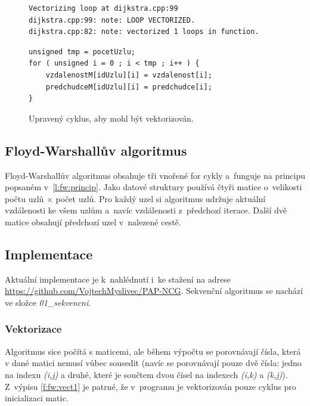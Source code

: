 \begin{figure}
    \centering
    \caption{Upravený cyklus, aby mohl být vektorizován.}
	\label{f:dij:vect3}
    \begin{lstlisting}
Vectorizing loop at dijkstra.cpp:99
dijkstra.cpp:99: note: LOOP VECTORIZED.
dijkstra.cpp:82: note: vectorized 1 loops in function.
    \end{lstlisting}
    
	\begin{lstlisting}
unsigned tmp = pocetUzlu;
for ( unsigned i = 0 ; i < tmp ; i++ ) {
	vzdalenostM[idUzlu][i] = vzdalenost[i];
	predchudceM[idUzlu][i] = predchudce[i];
}
	\end{lstlisting}
\end{figure}




\subsection{Floyd-Warshallův algoritmus}
Floyd-Warshallův algoritmus obsahuje tři vnořené for cykly a~funguje na principu popsaném v~\ref{l:fw:princip}. Jako datové struktury používá čtyři matice o~velikosti počtu uzlů $\times$ počet uzlů. Pro každý uzel si algoritmus udržuje aktuální vzdálenosti ke všem uzlům a~navíc vzdálenosti z~předchozí iterace. Další dvě matice obsahují předchozí uzel v~nalezené cestě. 

\subsection{Implementace}
Aktuální implementace je k~nahlédnutí i~ke stažení na adrese \url{https://github.com/VojtechMyslivec/PAP-NCG}. Sekvenční algoritmus se nachází ve složce \textit{01\_sekvencni}.

\subsubsection{Vektorizace}
Algoritmus sice počítá s maticemi, ale během výpočtu se porovnávají čísla, která v dané matici nemusí vůbec sousedit (navíc se porovnávají pouze dvě čísla: jedno na indexu \emph{(i,j)} a druhé, které je součtem dvou čísel na indexech \emph{(i,k)} a \emph{(k,j)}).
Z~výpisu \ref{f:fw:vect1} je patrné, že v~programu je vektorizován pouze cyklus pro inicializaci matic. 

